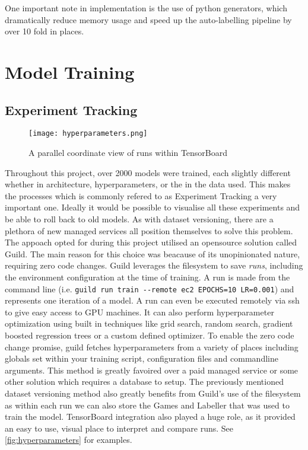 One important note in implementation is the use of python generators, which dramatically reduce memory usage and speed up the auto-labelling pipeline by over 10 fold in 
places.

\section{Model Training}

\subsection{Experiment Tracking}

\begin{figure}[h]
    \centering
    \texttt{[image: hyperparameters.png]}
    \caption{A parallel coordinate view of runs within TensorBoard}
    \label{fig:hyperparameters}
\end{figure}

\FloatBarrier
Throughout this project, over 2000 models were trained, each slightly different whether in architecture, hyperparameters, or the in the data used.  
This makes the processes which is commonly refered to as Experiment Tracking a very important one.
Ideally it would be possible to visualise all these experiments and be able to roll back to old models.  As with dataset versioning, there are a plethora of 
new managed services all position themselves to solve this problem.
The appoach opted for during this project utilised an opensource solution called Guild.  The main reason for this choice was beacause of 
its unopinionated nature, requiring zero code changes.  Guild leverages the filesystem to save \textit{runs}, including the environment configuration
at the time of training.  A run is made from the command line (i.e. \verb|guild run train --remote ec2 EPOCHS=10 LR=0.001|) and
represents one iteration of a model.  A run can even be executed remotely via ssh to give easy access to 
GPU machines.  It can also perform hyperparameter optimization using built in techniques like grid search, random search, gradient boosted regression trees 
or a custom defined optimizer.  To enable the zero code change promise, guild fetches hyperparameters from a variety of places including globals set within 
your training script, configuration files and commandline arguments.
This method is greatly favoired over a paid managed service or some other solution which requires a database to setup.  
The previously mentioned dataset versioning method also greatly benefits from Guild's use of the filesystem as within each run we can also store 
the Games and Labeller that was used to train the model. 
TensorBoard integration also played a huge role, as it provided an easy to use, visual place to interpret and compare runs.  See \autoref{fig:hyperparameters}
for examples.


